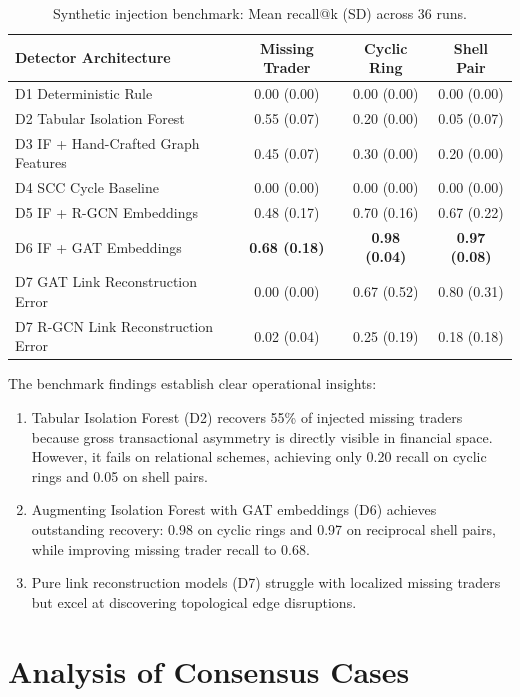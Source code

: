 \documentclass[10pt,twocolumn]{article}
\begin{document}
\begin{table}[t]
  \centering
  \small
  \caption{Synthetic injection benchmark: Mean recall@k (SD) across 36 runs.}
  \label{tab:injection}
  \begin{tabular}{lccc}
    \toprule
    Detector Architecture & Missing Trader & Cyclic Ring & Shell Pair \\
    \midrule
    D1 Deterministic Rule & 0.00 (0.00) & 0.00 (0.00) & 0.00 (0.00) \\
    D2 Tabular Isolation Forest & 0.55 (0.07) & 0.20 (0.00) & 0.05 (0.07) \\
    D3 IF + Hand-Crafted Graph Features & 0.45 (0.07) & 0.30 (0.00) & 0.20 (0.00) \\
    D4 SCC Cycle Baseline & 0.00 (0.00) & 0.00 (0.00) & 0.00 (0.00) \\
    D5 IF + R-GCN Embeddings & 0.48 (0.17) & 0.70 (0.16) & 0.67 (0.22) \\
    D6 IF + GAT Embeddings & \textbf{0.68 (0.18)} & \textbf{0.98 (0.04)} & \textbf{0.97 (0.08)} \\
    D7 GAT Link Reconstruction Error & 0.00 (0.00) & 0.67 (0.52) & 0.80 (0.31) \\
    D7 R-GCN Link Reconstruction Error & 0.02 (0.04) & 0.25 (0.19) & 0.18 (0.18) \\
    \bottomrule
  \end{tabular}
\end{table}

The benchmark findings establish clear operational insights:
\begin{enumerate}
  \item Tabular Isolation Forest (D2) recovers 55\% of injected missing traders because gross transactional asymmetry is directly visible in financial space. However, it fails on relational schemes, achieving only 0.20 recall on cyclic rings and 0.05 on shell pairs.
  \item Augmenting Isolation Forest with GAT embeddings (D6) achieves outstanding recovery: 0.98 on cyclic rings and 0.97 on reciprocal shell pairs, while improving missing trader recall to 0.68.
  \item Pure link reconstruction models (D7) struggle with localized missing traders but excel at discovering topological edge disruptions.
\end{enumerate}

\section{Analysis of Consensus Cases}
\label{sec:analysis}
\end{document}

